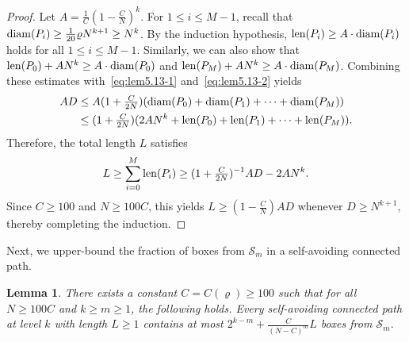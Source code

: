 \documentclass[a4paper]{article}
\numberwithin{equation}{section}
\newtheorem{lemma}[theorem]{Lemma}
\numberwithin{equation}{section}
\renewcommand{\1}{\mathbf{1}}
\begin{document}
\begin{proof}
    Let $A = \frac{1}{C} (1 - \frac{C}{N})^k$. For $1 \leq i \leq M-1$, recall that ${\rm diam}(P_i) \geq \frac{1}{20} \varrho N^{k+1} \geq N^k$. By the induction hypothesis, ${\rm len}(P_i) \geq A \cdot {\rm diam}(P_i)$ holds for all $1 \leq i \leq M - 1$. Similarly, we can also show that ${\rm len}(P_0) + A N^k \geq A \cdot {\rm diam}(P_0)$ and ${\rm len}(P_M) + A N^k \geq A \cdot {\rm diam}(P_M)$. Combining these estimates with~\eqref{eq:lem5.13-1} and~\eqref{eq:lem5.13-2} yields
    \begin{align*}
        AD &\leq A (1 + \tfrac{C}{2N}) ({\rm diam}(P_0) + {\rm diam}(P_1) + \cdots +  {\rm diam}(P_M)) \\
        &\leq (1 + \tfrac{C}{2N}) (2A N^k + {\rm len}(P_0) + {\rm len}(P_1) + \cdots +  {\rm len}(P_M)).
    \end{align*}
    Therefore, the total length $L$ satisfies
    \[ L \geq \sum_{i=0}^M {\rm len}(P_i) \geq (1 + \tfrac{C}{2N})^{-1} AD - 2A N^k. \]
    Since $C \geq 100$ and $N \geq 100C$, this yields $L \ge (1 - \frac{C}{N}) A D$ whenever $D \geq N^{k+1}$, thereby completing the induction.
\end{proof}

Next, we upper-bound the fraction of boxes from $\mathcal{S}_m$ in a self-avoiding connected path.

\begin{lemma}\label{lem:box-bound}
     There exists a constant $C = C(\varrho) \geq 100$ such that for all $N \geq 100 C$ and $k \geq m \geq 1$, the following holds. Every self-avoiding connected path at level $k$ with length $L \geq 1$ contains at most $2^{k-m} + \frac{C}{(N - C)^m} L$ boxes from $\mathcal{S}_m$.
\end{lemma}
\end{document}
